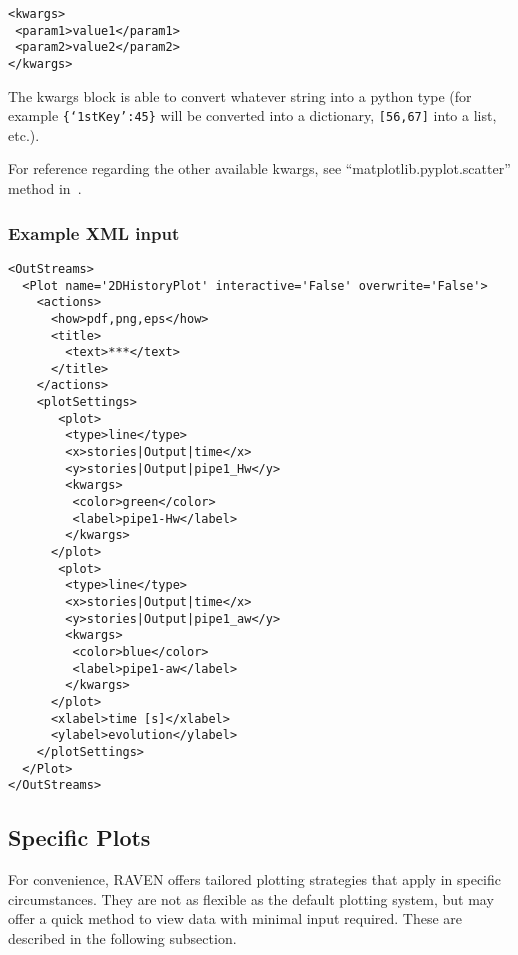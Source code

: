 \begin{itemize}
\begin{lstlisting}[style=XML]
<kwargs>
 <param1>value1</param1>
 <param2>value2</param2>
</kwargs>
\end{lstlisting}

  The kwargs block is able to convert whatever string into a python type (for
  example  \texttt{\{`1stKey':45\}} will
  be converted into a dictionary,
   \texttt{[56,67]}  into a list, etc.).

  For reference regarding the other available kwargs, see
  ``matplotlib.pyplot.scatter'' method in~\cite{MatPlotLib}.
\end{itemize}



\subsubsection{Example XML input}
\begin{lstlisting}[style=XML,morekeywords={name,interactive,overwrite}]
<OutStreams>
  <Plot name='2DHistoryPlot' interactive='False' overwrite='False'>
    <actions>
      <how>pdf,png,eps</how>
      <title>
        <text>***</text>
      </title>
    </actions>
    <plotSettings>
       <plot>
        <type>line</type>
        <x>stories|Output|time</x>
        <y>stories|Output|pipe1_Hw</y>
        <kwargs>
         <color>green</color>
         <label>pipe1-Hw</label>
        </kwargs>
      </plot>
       <plot>
        <type>line</type>
        <x>stories|Output|time</x>
        <y>stories|Output|pipe1_aw</y>
        <kwargs>
         <color>blue</color>
         <label>pipe1-aw</label>
        </kwargs>
      </plot>
      <xlabel>time [s]</xlabel>
      <ylabel>evolution</ylabel>
    </plotSettings>
  </Plot>
</OutStreams>
\end{lstlisting}


\subsection{Specific Plots \label{sec:outstreams.subplots}}
For convenience, RAVEN offers tailored plotting strategies that apply in specific circumstances.
They are not as flexible as the default plotting system, but may offer a quick method to view
data with minimal input required. These are described in the following subsection.

